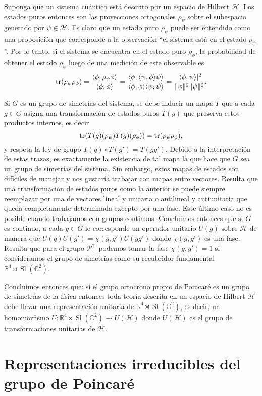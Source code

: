 \documentclass[11pt]{article}
\DeclareMathOperator{\Sl}{Sl}
\begin{document}
Suponga que un sistema cuántico está descrito por un espacio de Hilbert $\mathcal{H}$. Los estados puros entonces son las proyecciones ortogonales $\rho_\psi$ sobre el subespacio generado por $\psi\in\mathcal{H}$. Es claro que un estado puro $\rho_\psi$ puede ser entendido como una proposición que corresponde a la observación ``el sistema está en el estado $\rho_\psi$''. Por lo tanto, si el sistema se encuentra en el estado puro $\rho_\phi$, la probabilidad de obtener el estado $\rho_\psi$ luego de una medición de este observable es
\begin{equation}
\tr(\rho_\psi\rho_\phi)=\frac{\langle\phi,\rho_\psi\phi\rangle}{\langle\phi,\phi\rangle}=\frac{\langle\phi,\langle\psi,\phi\rangle\psi\rangle}{\langle \phi,\phi\rangle\langle\psi,\psi\rangle}=\frac{|\langle\phi,\psi\rangle|^2}{\|\phi\|^2\|\psi\|^2}.
\end{equation}

Si $G$ es un grupo de simetrías del sistema, se debe inducir un mapa $T$ que a cada $g\in G$ asigna una transformación de estados puros $T(g)$ que preserva estos productos internos, es decir
\begin{equation}
\tr(T(g)(\rho_\psi)T(g)(\rho_\phi))=\tr(\rho_\psi\rho_\phi),
\end{equation} 
y respeta la ley de grupo $T(g)\circ T(g')=T(gg')$. Debido a la interpretación de estas trazas, es exactamente la existencia de tal mapa la que hace que $G$ sea un grupo de simetrías del sistema. Sin embargo, estos mapas de estados son difíciles de manejar y nos gustaría trabajar con mapas entre vectores. Resulta que una transformación de estados puros como la anterior se puede siempre reemplazar por una de vectores lineal y unitaria o antilineal y antiunitaria que queda completamente determinada excepto por una fase\cite{Haag1992}. Este último caso no es posible cuando trabajamos con grupos continuos. Concluimos entonces que si $G$ es continuo, a cada $g\in G$ le corresponde un operador unitario $U(g)$ sobre $\mathcal{H}$ de manera que $U(g)U(g')=\chi(g,g')U(gg')$ donde $\chi(g,g')$ es una fase. Resulta que para el grupo $\mathcal{P}_+^\uparrow$ podemos tomar la fase $\chi(g,g')=1$ si consideramos el grupo de simetrías como su recubridor fundamental $\mathbb{R}^4\rtimes\Sl(\mathbb{C}^2)$\cite{Haag1992}. 

Concluimos entonces que: si el grupo ortocrono propio de Poincaré es un grupo de simetrías de la física entonces toda teoría descrita en un espacio de Hilbert $\mathcal{H}$ debe llevar una representación unitaria de $\mathbb{R}^4\rtimes\Sl(\mathbb{C}^2)$, es decir, un homomorfismo $U:\mathbb{R}^4\rtimes\Sl(\mathbb{C}^2)\rightarrow U(\mathcal{H})$ donde $U(\mathcal{H})$ es el grupo de transformaciones unitarias de $\mathcal{H}$.

\section{Representaciones irreducibles del grupo de Poincaré}



\end{document}
